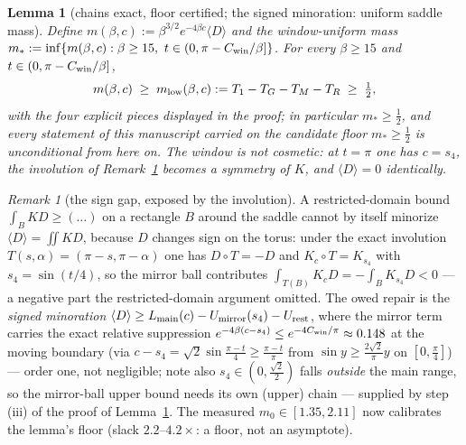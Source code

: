 \documentclass[11pt]{article}
\newtheorem{lemma}[theorem]{Lemma}
\theoremstyle{remark}
\newtheorem{remark}[theorem]{Remark}
\begin{document}
\begin{lemma}[chains exact, floor certified; the signed minoration:
uniform saddle mass]
\label{lem:mass}
Define $m(\beta,c):=\beta^{3/2}e^{-4\beta c}\langle D\rangle$ and
the window-uniform mass
$m_*:=\inf\{m(\beta,c):\beta\ge15,\ t\in(0,\pi-C_{\rm win}/\beta]\}$.
For every $\beta\ge15$ and $t\in(0,\pi-C_{\rm win}/\beta]$,
\[
m(\beta,c)\;\ge\;m_{\rm low}(\beta,c):=T_1-T_G-T_M-T_R
\;\ge\;\tfrac12,
\]
with the four explicit pieces displayed in the proof; in particular
$m_*\ge\tfrac12$, and every statement of this manuscript carried on
the candidate floor $m_*\ge\tfrac12$ is unconditional from here on.
The window is not cosmetic: at $t=\pi$ one has $c=s_4$, the
involution of Remark~\ref{rem:signgap} becomes a symmetry of $K$,
and $\langle D\rangle=0$ identically.
\end{lemma}

\begin{remark}[the sign gap, exposed by the involution]
\label{rem:signgap}
A restricted-domain bound $\int_{B}KD\ge(\ldots)$ on a rectangle
$B$ around the saddle cannot by itself minorize
$\langle D\rangle=\iint KD$, because $D$ changes sign on the
torus: under the exact involution
$T(s,\alpha)=(\pi-s,\pi-\alpha)$ one has $D\circ T=-D$ and
$K_c\circ T=K_{s_4}$ with $s_4=\sin(t/4)$, so the mirror ball
contributes $\int_{T(B)}K_cD=-\int_BK_{s_4}D<0$ --- a negative
part the restricted-domain argument omitted. The owed repair is the
\emph{signed minoration}
$\langle D\rangle\ge L_{\rm main}(c)-U_{\rm mirror}(s_4)
-U_{\rm rest}$, where the mirror term carries the exact relative
suppression $e^{-4\beta(c-s_4)}\le e^{-4C_{\rm win}/\pi}
\approx0.148$ at the moving boundary \textup{(}via
$c-s_4=\sqrt2\sin\tfrac{\pi-t}{4}\ge\tfrac{\pi-t}{\pi}$ from
$\sin y\ge\tfrac{2\sqrt2}{\pi}y$ on $[0,\tfrac\pi4]$\textup{)} ---
order one, not negligible; note also $s_4\in(0,\tfrac{\sqrt2}2)$
falls \emph{outside} the main range, so the mirror-ball upper
bound needs its own (upper) chain --- supplied by step
\textup{(iii)} of the proof of Lemma~\ref{lem:mass}. The measured
$m_0\in[1.35,2.11]$ now calibrates the lemma's floor
\textup{(}slack $2.2$--$4.2\times$: a floor, not an
asymptote\textup{)}.
\end{remark}
\end{document}
